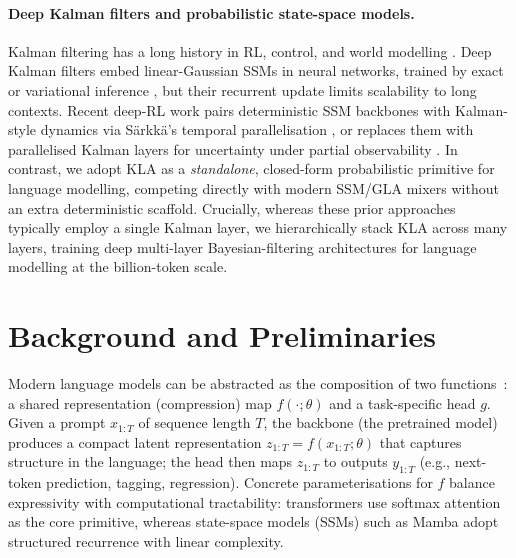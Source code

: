\documentclass{article}
\newcommand{\our}{\textsc{KLA}\xspace}
\begin{document}
\paragraph{Deep Kalman filters and probabilistic state-space models.}
Kalman filtering \citep{kalman1960new} has a long history in RL, control, and world modelling \citep{haarnoja2016rl,watter2015e2c,hafner2019planet,hafner2020dreamer,shaj2023multi}. Deep Kalman filters embed linear-Gaussian SSMs in neural networks, trained by exact or variational inference \citep{krishnan2015deepkf,krishnan2017structured,karl2016dsvae,fraccaro2017rssm,becker2019rkn,shaj2021action}, but their recurrent update limits scalability to long contexts. Recent deep-RL work pairs deterministic SSM backbones with Kalman-style dynamics via S\"{a}rkk\"{a}'s temporal parallelisation \citep{becker2024kalmamba}, or replaces them with parallelised Kalman layers for uncertainty under partial observability \citep{luis2024uncertainty}. In contrast, we adopt \textsc{\our} as a \emph{standalone}, closed-form probabilistic primitive for language modelling, competing directly with modern SSM/GLA mixers without an extra deterministic scaffold. Crucially, whereas these prior approaches typically employ a single Kalman layer, we hierarchically stack \our across many layers, training deep multi-layer Bayesian-filtering architectures for language modelling at the billion-token scale.


\section{Background and Preliminaries}
\label{sec:background}

Modern language models can be abstracted as the composition of two functions~\citep{alonso2025state}: a shared
representation (compression) map $f(\cdot;\theta)$ and a task-specific head $g$. Given a
prompt $x_{1:T}$ of sequence length $T$, the backbone (the pretrained model) produces a compact latent
representation $z_{1:T}=f(x_{1:T};\theta)$ that captures structure in the language; the
head then maps $z_{1:T}$ to outputs $y_{1:T}$ (e.g., next-token prediction, tagging,
regression).
Concrete parameterisations for $f$ balance expressivity with computational tractability: transformers use softmax attention as the core primitive, whereas state-space models (SSMs) such as Mamba adopt structured recurrence with linear complexity.
\end{document}
